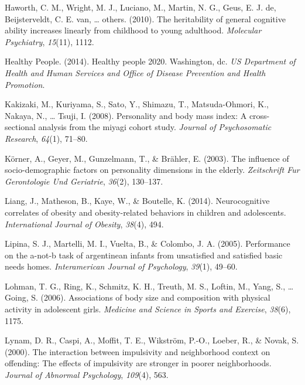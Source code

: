 \documentclass[man]{apa6}
\begin{document}
\leavevmode\hypertarget{ref-haworth2010heritability}{}%
Haworth, C. M., Wright, M. J., Luciano, M., Martin, N. G., Geus, E. J. de, Beijsterveldt, C. E. van, \ldots{} others. (2010). The heritability of general cognitive ability increases linearly from childhood to young adulthood. \emph{Molecular Psychiatry}, \emph{15}(11), 1112.

\leavevmode\hypertarget{ref-us2014healthy}{}%
Healthy People. (2014). Healthy people 2020. Washington, dc. \emph{US Department of Health and Human Services and Office of Disease Prevention and Health Promotion}.

\leavevmode\hypertarget{ref-kakizaki2008personality}{}%
Kakizaki, M., Kuriyama, S., Sato, Y., Shimazu, T., Matsuda-Ohmori, K., Nakaya, N., \ldots{} Tsuji, I. (2008). Personality and body mass index: A cross-sectional analysis from the miyagi cohort study. \emph{Journal of Psychosomatic Research}, \emph{64}(1), 71--80.

\leavevmode\hypertarget{ref-korner2003influence}{}%
Körner, A., Geyer, M., Gunzelmann, T., \& Brähler, E. (2003). The influence of socio-demographic factors on personality dimensions in the elderly. \emph{Zeitschrift Fur Gerontologie Und Geriatrie}, \emph{36}(2), 130--137.

\leavevmode\hypertarget{ref-liang2014neurocognitive}{}%
Liang, J., Matheson, B., Kaye, W., \& Boutelle, K. (2014). Neurocognitive correlates of obesity and obesity-related behaviors in children and adolescents. \emph{International Journal of Obesity}, \emph{38}(4), 494.

\leavevmode\hypertarget{ref-lipina2005performance}{}%
Lipina, S. J., Martelli, M. I., Vuelta, B., \& Colombo, J. A. (2005). Performance on the a-not-b task of argentinean infants from unsatisfied and satisfied basic needs homes. \emph{Interamerican Journal of Psychology}, \emph{39}(1), 49--60.

\leavevmode\hypertarget{ref-lohman2006associations}{}%
Lohman, T. G., Ring, K., Schmitz, K. H., Treuth, M. S., Loftin, M., Yang, S., \ldots{} Going, S. (2006). Associations of body size and composition with physical activity in adolescent girls. \emph{Medicine and Science in Sports and Exercise}, \emph{38}(6), 1175.

\leavevmode\hypertarget{ref-lynam2000interaction}{}%
Lynam, D. R., Caspi, A., Moffit, T. E., Wikström, P.-O., Loeber, R., \& Novak, S. (2000). The interaction between impulsivity and neighborhood context on offending: The effects of impulsivity are stronger in poorer neighborhoods. \emph{Journal of Abnormal Psychology}, \emph{109}(4), 563.
\end{document}
